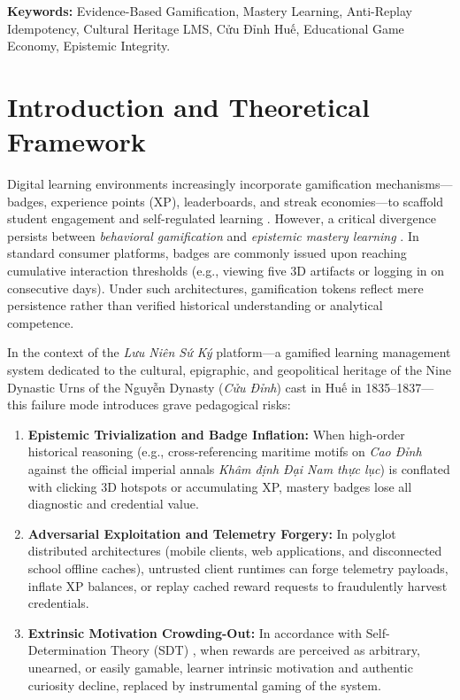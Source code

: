 \documentclass[11pt,a4paper]{article}
\begin{document}
\noindent\textbf{Keywords:} Evidence-Based Gamification, Mastery Learning, Anti-Replay Idempotency, Cultural Heritage LMS, Cửu Đỉnh Huế, Educational Game Economy, Epistemic Integrity.

\section{Introduction and Theoretical Framework}

Digital learning environments increasingly incorporate gamification mechanisms—badges, experience points (XP), leaderboards, and streak economies—to scaffold student engagement and self-regulated learning \cite{deterding2011game, hamari2014does}. However, a critical divergence persists between \textit{behavioral gamification} and \textit{epistemic mastery learning} \cite{bloom1968mastery}. In standard consumer platforms, badges are commonly issued upon reaching cumulative interaction thresholds (e.g., viewing five 3D artifacts or logging in on consecutive days). Under such architectures, gamification tokens reflect mere persistence rather than verified historical understanding or analytical competence.

In the context of the \textit{Lưu Niên Sứ Ký} platform—a gamified learning management system dedicated to the cultural, epigraphic, and geopolitical heritage of the Nine Dynastic Urns of the Nguyễn Dynasty (\textit{Cửu Đỉnh}) cast in Huế in 1835–1837—this failure mode introduces grave pedagogical risks:
\begin{enumerate}[leftmargin=*]
    \item \textbf{Epistemic Trivialization and Badge Inflation:} When high-order historical reasoning (e.g., cross-referencing maritime motifs on \textit{Cao Đỉnh} against the official imperial annals \textit{Khâm định Đại Nam thực lục}) is conflated with clicking 3D hotspots or accumulating XP, mastery badges lose all diagnostic and credential value.
    \item \textbf{Adversarial Exploitation and Telemetry Forgery:} In polyglot distributed architectures (mobile clients, web applications, and disconnected school offline caches), untrusted client runtimes can forge telemetry payloads, inflate XP balances, or replay cached reward requests to fraudulently harvest credentials.
    \item \textbf{Extrinsic Motivation Crowding-Out:} In accordance with Self-Determination Theory (SDT) \cite{ryan2000self}, when rewards are perceived as arbitrary, unearned, or easily gamable, learner intrinsic motivation and authentic curiosity decline, replaced by instrumental gaming of the system.
\end{enumerate}
\end{document}
